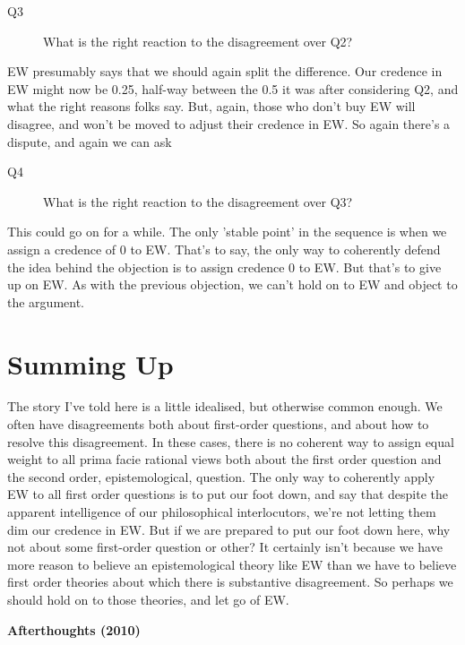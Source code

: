 \begin{description}
\item[Q3] What is the right reaction to the disagreement over Q2?
\end{description}

\noindent EW presumably says that we should again split the difference. Our credence in EW might now be 0.25, half-way between the 0.5 it was after considering Q2, and what the right reasons folks say. But, again, those who don't buy EW will disagree, and won't be moved to adjust their credence in EW. So again there's a dispute, and again we can ask

\begin{description}
\item[Q4] What is the right reaction to the disagreement over Q3?
\end{description}

\noindent This could go on for a while. The only 'stable point' in the sequence is when we assign a credence of 0 to EW. That's to say, the only way to coherently defend the idea behind the objection is to assign credence 0 to EW. But that's to give up on EW. As with the previous objection, we can't hold on to EW and object to the argument.

\section{Summing Up}
The story I've told here is a little idealised, but otherwise common enough. We often have disagreements both about first-order questions, and about how to resolve this disagreement. In these cases, there is no coherent way to assign equal weight to all prima facie rational views both about the first order question and the second order, epistemological, question. The only way to coherently apply EW to all first order questions is to put our foot down, and say that despite the apparent intelligence of our philosophical interlocutors, we're not letting them dim our credence in EW. But if we are prepared to put our foot down here, why not about some first-order question or other? It certainly isn't because we have more reason to believe an epistemological theory like EW than we have to believe first order theories about which there is substantive disagreement. So perhaps we should hold on to those theories, and let go of EW. 

\begin{Large}
\begin{center}
\textbf{Afterthoughts (2010)}
\end{center}
\end{Large}

